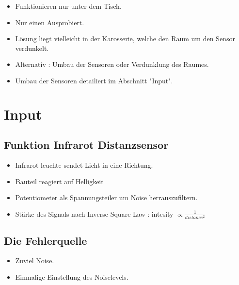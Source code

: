 \documentclass{article}
\begin{document}
\begin{itemize}

\item Funktionieren nur unter dem Tisch.

\item Nur einen Ausprobiert.

\item Lösung liegt vielleicht in der Karosserie, welche den Raum um den Sensor verdunkelt.

\item Alternativ : Umbau der Sensoren oder Verdunklung des Raumes.

\item Umbau der Sensoren detailiert im Abschnitt "Input". 

\end{itemize}

\section{Input}

\subsection{Funktion Infrarot Distanzsensor}

\begin{itemize}


\item Infrarot leuchte sendet Licht in eine Richtung.

\item Bauteil reagiert auf Helligkeit

\item Potentiometer als Spannungsteiler um Noise herrauszufiltern. 

\item Stärke des Signals nach Inverse Square Law : intesity $\propto \frac{1}{distance^2}$ 

\end{itemize}

\subsection{Die Fehlerquelle}

\begin{itemize}

\item Zuviel Noise.

\item Einmalige Einstellung des Noiselevels.

\end{itemize}
\end{document}
